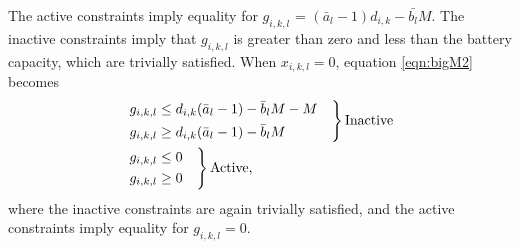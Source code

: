 The active constraints imply equality for $g_{i,k,l}$ = $(\bar{a}_l - 1)d_{i,k} - \bar{b_l}M$.  The inactive constraints imply that $g_{i,k,l}$ is greater than zero and less than the battery capacity, which are trivially satisfied. When $x_{i,k,l} = 0$, equation \ref{eqn:bigM2} becomes
\begin{equation}
	\begin{aligned}
		& \begin{rcases}
			g_{i,k,l} \le d_{i,k}(\bar{a}_l - 1) - \bar{b}_lM - M &\\
			g_{i,k,l} \ge d_{i,k}(\bar{a}_l - 1) - \bar{b}_lM &\\
		\end{rcases} \text{Inactive} \\
		& \begin{rcases}
			g_{i,k,l}\le 0 & \\
			g_{i,k,l}\ge 0 & \\ 
		\end{rcases}\text{Active,}\\
	\end{aligned}
\end{equation}
where the inactive constraints are again trivially satisfied, and the
active constraints imply equality for $g_{i,k,l} = 0$.

